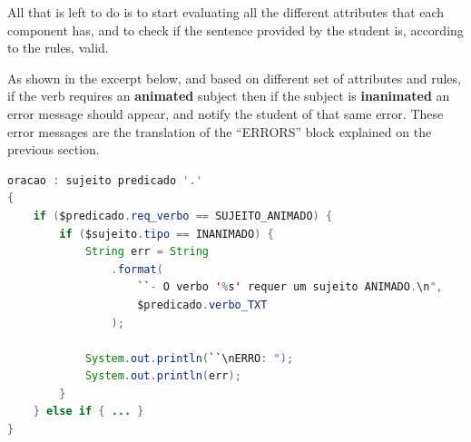 
All that is left to do is to start evaluating all the different attributes that each component has, and to check if the sentence provided by the student is, according to the rules, valid. 

As shown in the excerpt below, and based on different set of attributes and rules, if the verb requires an \textbf{animated} subject then if the subject is \textbf{inanimated} an error message should appear, and notify the student of that same error. These error messages are the translation of the ``ERRORS'' block explained on the previous section.

\begin{center}
\begin{minipage}{12cm}
\begin{lstlisting}[language=java, basicstyle=\small, label={lst:case_study_oracao}, caption=Example DSL attribute validation]
oracao : sujeito predicado '.'
{
    if ($predicado.req_verbo == SUJEITO_ANIMADO) {
        if ($sujeito.tipo == INANIMADO) {
            String err = String
                .format(
                    ``- O verbo '%s' requer um sujeito ANIMADO.\n",
                    $predicado.verbo_TXT
                );

            System.out.println(``\nERRO: ");
            System.out.println(err);
        }
    } else if { ... }
}
\end{lstlisting}
\end{minipage}
\end{center}

%

